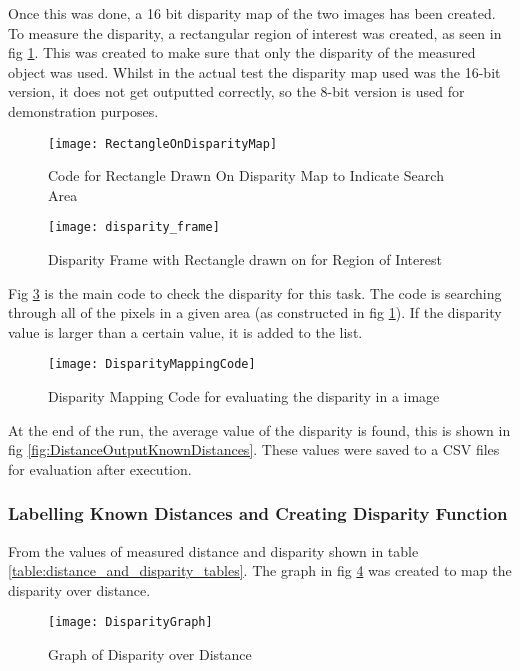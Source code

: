 \documentclass[conference]{IEEEtran}
\begin{document}
Once this was done, a 16 bit disparity map of the two images has been created. To measure the disparity, a rectangular region of interest was created, as seen in fig \ref{fig:RectangleOnDisparityMap}. This was created to make sure that only the disparity of the measured object was used. Whilst in the actual test the disparity map used was the 16-bit version, it does not get outputted correctly, so the 8-bit version is used for demonstration purposes.

\begin{figure}[H]
\centerline{\texttt{[image: RectangleOnDisparityMap]}}
\caption{Code for Rectangle Drawn On Disparity Map to Indicate Search Area}
\label{fig:RectangleOnDisparityMap}
\end{figure}

\begin{figure}[H]
\centerline{\texttt{[image: disparity\_frame]}}
\caption{Disparity Frame with Rectangle drawn on for Region of Interest}
\label{fig:disparity_frame}
\end{figure}

Fig \ref{fig:DisparityMappingCode} is the main code to check the disparity for this task. The code is searching through all of the pixels in a given area (as constructed in fig \ref{fig:RectangleOnDisparityMap}). If the disparity value is larger than a certain value, it is added to the list. 

\begin{figure}[H]
\centerline{\texttt{[image: DisparityMappingCode]}}
\caption{Disparity Mapping Code for evaluating the disparity in a image}
\label{fig:DisparityMappingCode}
\end{figure}

At the end of the run, the average value of the disparity is found, this is shown in fig \ref{fig:DistanceOutputKnownDistances}. These values were saved to a CSV files for evaluation after execution. 

\subsubsection{Labelling Known Distances and Creating Disparity Function}

From the values of measured distance and disparity shown in table \ref{table:distance_and_disparity_tables}. The graph in fig \ref{fig:DisparityGraph} was created to map the disparity over distance.

\begin{figure}[H]
\centerline{\texttt{[image: DisparityGraph]}}
\caption{Graph of Disparity over Distance }
\label{fig:DisparityGraph}
\end{figure} 
\end{document}
